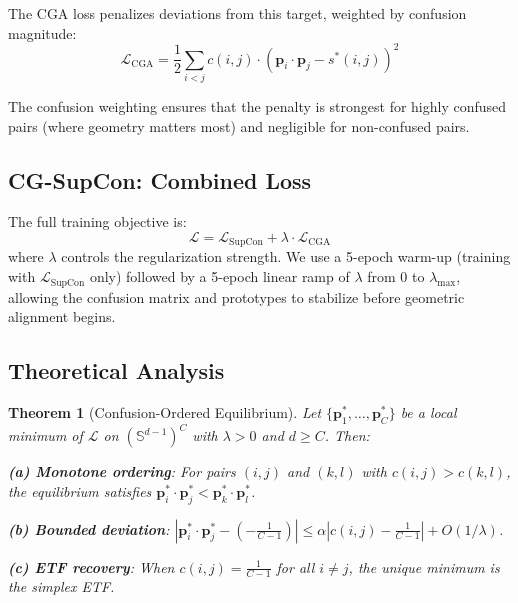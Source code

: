 \documentclass{article}
\newtheorem{theorem}{Theorem}
\newcommand{\lsupcon}{\mathcal{L}_{\text{SupCon}}}
\newcommand{\lcga}{\mathcal{L}_{\text{CGA}}}
\newcommand{\ltotal}{\mathcal{L}}
\newcommand{\Sph}{\mathbb{S}}
\begin{document}
The CGA loss penalizes deviations from this target, weighted by confusion magnitude:
\begin{equation}
\lcga = \frac{1}{2} \sum_{i < j} c(i,j) \cdot \left(\mathbf{p}_i \cdot \mathbf{p}_j - s^*(i,j)\right)^2
\label{eq:cga}
\end{equation}

The confusion weighting ensures that the penalty is strongest for highly confused pairs (where geometry matters most) and negligible for non-confused pairs.

\subsection{CG-SupCon: Combined Loss}

The full training objective is:
\begin{equation}
\ltotal = \lsupcon + \lambda \cdot \lcga
\label{eq:total}
\end{equation}
where $\lambda$ controls the regularization strength. We use a 5-epoch warm-up (training with $\lsupcon$ only) followed by a 5-epoch linear ramp of $\lambda$ from 0 to $\lambda_{\max}$, allowing the confusion matrix and prototypes to stabilize before geometric alignment begins.

\subsection{Theoretical Analysis}

\begin{theorem}[Confusion-Ordered Equilibrium]
\label{thm:main}
Let $\{\mathbf{p}_1^*, \ldots, \mathbf{p}_C^*\}$ be a local minimum of $\ltotal$ on $(\Sph^{d-1})^C$ with $\lambda > 0$ and $d \geq C$. Then:

\textbf{(a) Monotone ordering}: For pairs $(i,j)$ and $(k,l)$ with $c(i,j) > c(k,l)$, the equilibrium satisfies $\mathbf{p}_i^* \cdot \mathbf{p}_j^* < \mathbf{p}_k^* \cdot \mathbf{p}_l^*$.

\textbf{(b) Bounded deviation}: $|\mathbf{p}_i^* \cdot \mathbf{p}_j^* - (-\frac{1}{C-1})| \leq \alpha |c(i,j) - \frac{1}{C-1}| + O(1/\lambda)$.

\textbf{(c) ETF recovery}: When $c(i,j) = \frac{1}{C-1}$ for all $i \neq j$, the unique minimum is the simplex ETF.
\end{theorem}
\end{document}
